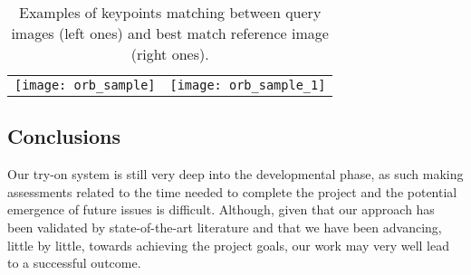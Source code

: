 \FloatBarrier
\begin{table}[hbt!]
\centering

\begin{tabular}{cc}
\texttt{[image: orb\_sample]} & \texttt{[image: orb\_sample\_1]} \\
\end{tabular}

\caption{\label{orb_samples} Examples of keypoints matching between query images (left ones) and best match reference image (right ones).}

\end{table}
\FloatBarrier


\begin{multicols}{2}

\subsection{Conclusions}
Our try-on system is still very deep into the developmental phase, as such making assessments related to the time needed to complete the project and the potential emergence of future issues is difficult.
Although, given that our approach has been validated by state-of-the-art literature and that we have been advancing, little by little, towards achieving the project goals, our work may very well lead to a successful outcome.

\end{multicols}